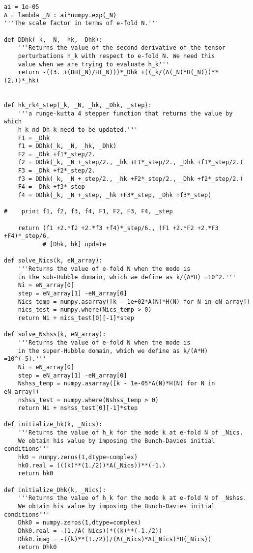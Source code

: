 \documentclass[12pt,a4paper,oneside]{book}
\begin{document}
\begin{appendices}
\begin{small}
\begin{verbatim}
ai = 1e-05
A = lambda _N : ai*numpy.exp(_N)
'''The scale factor in terms of e-fold N.'''

def DDhk(_k, _N, _hk, _Dhk):
    '''Returns the value of the second derivative of the tensor 
    perturbations h_k with respect to e-fold N. We need this 
    value when we are trying to evaluate h_k'''
    return -((3. +(DH(_N)/H(_N)))*_Dhk +((_k/(A(_N)*H(_N)))**(2.))*_hk)


def hk_rk4_step(_k, _N, _hk, _Dhk, _step):
    '''a runge-kutta 4 stepper function that returns the value by which
    h_k nd Dh_k need to be updated.'''
    F1 = _Dhk
    f1 = DDhk(_k, _N, _hk, _Dhk)
    F2 = _Dhk +f1*_step/2.
    f2 = DDhk(_k, _N +_step/2., _hk +F1*_step/2., _Dhk +f1*_step/2.)
    F3 = _Dhk +f2*_step/2.
    f3 = DDhk(_k, _N +_step/2., _hk +F2*_step/2., _Dhk +f2*_step/2.)
    F4 = _Dhk +f3*_step
    f4 = DDhk(_k, _N +_step, _hk +F3*_step, _Dhk +f3*_step)

#    print f1, f2, f3, f4, F1, F2, F3, F4, _step

    return (f1 +2.*f2 +2.*f3 +f4)*_step/6., (F1 +2.*F2 +2.*F3 +F4)*_step/6.
           # [Dhk, hk] update

def solve_Nics(k, eN_array):
    '''Returns the value of e-fold N when the mode is
    in the sub-Hubble domain, which we define as k/(A*H) =10^2.'''
    Ni = eN_array[0]
    step = eN_array[1] -eN_array[0]
    Nics_temp = numpy.asarray([k - 1e+02*A(N)*H(N) for N in eN_array])
    nics_test = numpy.where(Nics_temp > 0)
    return Ni + nics_test[0][-1]*step

def solve_Nshss(k, eN_array):
    '''Returns the value of e-fold N when the mode is
    in the super-Hubble domain, which we define as k/(A*H) =10^(-5).'''
    Ni = eN_array[0]
    step = eN_array[1] -eN_array[0]
    Nshss_temp = numpy.asarray([k - 1e-05*A(N)*H(N) for N in eN_array])
    nshss_test = numpy.where(Nshss_temp > 0)
    return Ni + nshss_test[0][-1]*step

def initialize_hk(k, _Nics):
    '''Returns the value of h_k for the mode k at e-fold N of _Nics.
    We obtain his value by imposing the Bunch-Davies initial conditions'''
    hk0 = numpy.zeros(1,dtype=complex)
    hk0.real = (((k)**(1./2))*A(_Nics))**(-1.)
    return hk0

def initialize_Dhk(k, _Nics):
    '''Returns the value of h_k for the mode k at e-fold N of _Nshss.
    We obtain his value by imposing the Bunch-Davies initial conditions'''
    Dhk0 = numpy.zeros(1,dtype=complex)
    Dhk0.real = -(1./A(_Nics))*((k)**(-1./2))
    Dhk0.imag = -((k)**(1./2))/(A(_Nics)*A(_Nics)*H(_Nics))
    return Dhk0


\end{verbatim}
\end{small}
\end{appendices}
\end{document}
